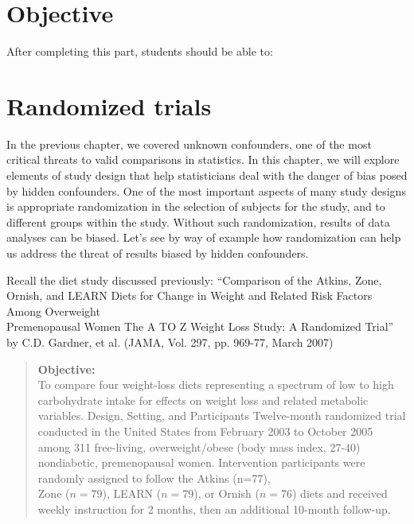 \documentclass[11pt, chapterprefix=true]{scrbook}\usepackage[]{graphicx}\usepackage[]{color}
\begin{document}
\section{Objective}

After completing this part, students should be able to:


\section{Randomized trials}

In the previous chapter, we covered unknown confounders, one of the most critical threats to valid comparisons in statistics. In this chapter, we will explore elements of study design that help statisticians deal with the danger of bias posed by hidden confounders. One of the most important aspects of many study designs is appropriate randomization in the selection of subjects for the study, and to different groups within the study. Without such randomization, results of data analyses can be biased. Let's see by way of example how randomization can help us address the threat of results biased by hidden confounders.

Recall the diet study discussed previously: ``Comparison of the Atkins, Zone, Ornish, and LEARN Diets for Change in Weight and Related Risk Factors Among Overweight \\ Premenopausal Women The A TO Z Weight Loss Study: A Randomized Trial'' by C.D. Gardner, et al. (JAMA, Vol. 297, pp. 969-77, March 2007)

\begin{quotation}
 \textbf{Objective:} \\ To compare four weight-loss diets representing a spectrum of low to high carbohydrate intake for effects on weight loss and related metabolic variables. Design, Setting, and Participants Twelve-month randomized trial conducted in the United States from February 2003 to October 2005 among 311 free-living, overweight/obese (body mass index, 27-40) nondiabetic, premenopausal women.  Intervention participants were randomly assigned to follow the Atkins (n=77), \\ Zone ($n = 79$), LEARN ($n = 79$), or Ornish ($n = 76$) diets and received weekly instruction for 2 months, then an additional 10-month follow-up.
\end{quotation}
\end{document}
